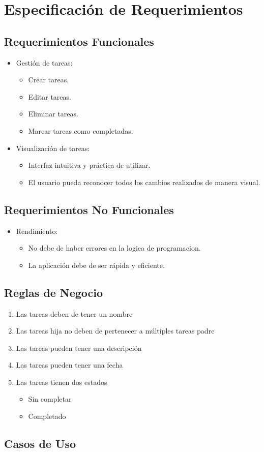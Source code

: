 \chapter{Especificación de Requerimientos}
\section{Requerimientos Funcionales}
\begin{itemize}
  \item Gestión de tareas:
    \begin{itemize}
      \item Crear tareas.
      \item Editar tareas.
      \item Eliminar tareas.
      \item Marcar tareas como completadas.
    \end{itemize}
  \item Visualización de tareas:
    \begin{itemize}
      \item Interfaz intuitiva y práctica de utilizar.
      \item El usuario pueda reconocer todos los cambios realizados de manera visual.
    \end{itemize}
\end{itemize}

\section{Requerimientos No Funcionales}
\begin{itemize}
  \item Rendimiento:
    \begin{itemize}
      \item No debe de haber errores en la logica de programacion.
      \item La aplicación debe de ser rápida y eficiente.
    \end{itemize}
\end{itemize}
\section{Reglas de Negocio}
\begin{enumerate}[start=1, label={RN\arabic*.}]
  \item Las tareas deben de tener un nombre
  \item Las tareas hija no deben de pertenecer a m\'ultiples tareas padre
  \item Las tareas pueden tener una descripci\'on
  \item Las tareas pueden tener una fecha
  \item Las tareas tienen dos estados
  \begin{itemize}
    \item Sin completar
    \item Completado
  \end{itemize}
\end{enumerate}
\section{Casos de Uso}

